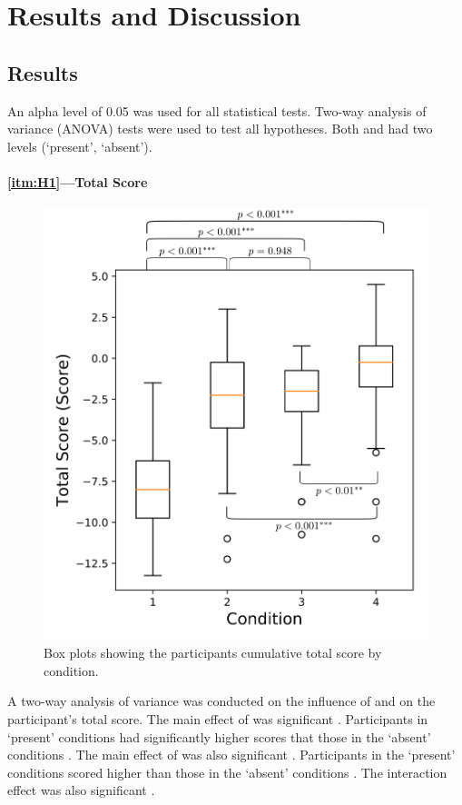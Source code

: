 \section{Results and Discussion} \label{sec:results_discussion}
\subsection{Results} \label{sec:results}
An alpha level of 0.05 was used for all statistical tests. Two-way analysis of variance (ANOVA) tests were used to test all hypotheses. Both \xQ{} and \xO had two levels (`present', `absent').

\paragraph{\ref{itm:H1}---Total Score}
       \begin{figure}[tb]
            \centering
            \includegraphics[width=0.8\linewidth]{Figures/total_score_box.png}
            \caption{Box plots showing the participants cumulative total score by condition.}
            \label{fig:score_box}
       \end{figure}
A two-way analysis of variance was conducted on the influence of \xQ{} and \xO{} on the participant's total score. The main effect of \xQ{} was significant . Participants in \xQ{} `present' conditions had significantly higher scores  that those in the \xQ{} `absent' conditions . The main effect of \xO{} was also significant . Participants in the \xO{} `present' conditions scored higher  than those in the \xO{} `absent' conditions . The interaction effect was also significant .

